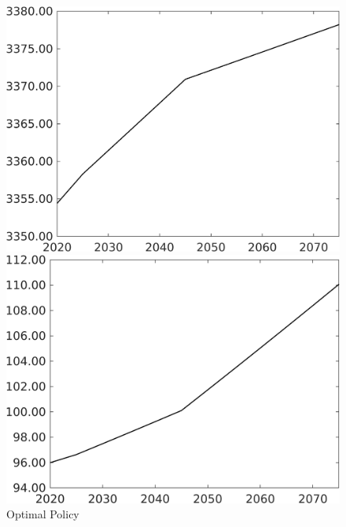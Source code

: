 \begin{figure}[h!!]
	\centering
	\caption{Optimal Policy }\label{fig:optAll}
	\begin{minipage}[]{0.32\textwidth}
		\includegraphics[width=1\textwidth]{../../codding_model/own_basedOnFried/optimalPol_elastS_DisuSci/figures/all_1705/Single_OPT_T_NoTaus_Af_spillover0_sep1_BN0_ineq0_etaa0.79.png}
	\end{minipage}
	\begin{minipage}[]{0.32\textwidth}
		\includegraphics[width=1\textwidth]{../../codding_model/own_basedOnFried/optimalPol_elastS_DisuSci/figures/all_1705/Single_OPT_T_NoTaus_Ag_spillover0_sep1_BN0_ineq0_etaa0.79.png}

\end{minipage}
\end{figure}
